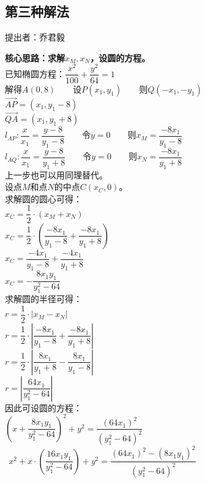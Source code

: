 \documentclass[UTF8]{ctexart}
\begin{document}
\subsection{第三种解法}
    \begin{center}
        提出者：乔君毅
    \end{center}
    \begin{multicols}{2}
        \small
        \textbf{核心思路：求解$x_M,x_N$，设圆的方程。}\\[4mm]
        已知椭圆方程：$\dfrac{x^2}{100}+\dfrac{y^2}{64}=1$\\[5mm]
        解得$A(0,8)$~~~~设$P(x_1,y_1)$~~~~则$Q(-x_1,-y_1)$\\[5mm]
        $\overrightarrow{AP}=(x_1,y_1-8)$\\[5mm]
        $\overrightarrow{QA}=(x_1,y_1+8)$\\[5mm]
        $l_{AP}:\dfrac{x}{x_1}=\dfrac{y-8}{y_1-8}$~~~~令$y=0$~~~~则$x_M=\dfrac{-8x_1}{y_1-8}$\\[5mm]
        $l_{AQ}:\dfrac{x}{x_1}=\dfrac{y-8}{y_1+8}$~~~~令$y=0$~~~~则$x_N=\dfrac{-8x_1}{y_1+8}$\\[5mm]
        上一步也可以用同理替代。\\[8mm]
        设点$M$和点$N$的中点$C(x_C,0)$。\\[3mm]
        求解圆的圆心可得：\\[4mm]
        $x_C=\dfrac{1}{2}\cdot(x_M+x_N)$\\[5mm]
        $x_C=\dfrac{1}{2}\cdot\left(\dfrac{-8x_1}{y_1-8}+\dfrac{-8x_1}{y_1+8}\right)$\\[5mm]
        $x_C=\dfrac{-4x_1}{y_1-8}+\dfrac{-4x_1}{y_1+8}$\\[5mm]
        $x_C=-\dfrac{8x_1y_1}{y_1^2-64}$\\[5mm]
        求解圆的半径可得：\\[4mm]
        $r=\dfrac{1}{2}\cdot\left|x_M-x_N\right|$\\[5mm]
        $r=\dfrac{1}{2}\cdot\left|\dfrac{-8x_1}{y_1-8}+\dfrac{-8x_1}{y_1+8}\right|$\\[5mm]
        $r=\dfrac{1}{2}\cdot\left|\dfrac{8x_1}{y_1+8}-\dfrac{8x_1}{y_1-8}\right|$\\[5mm]
        $r=\left|\dfrac{64x_1}{y_1^2-64}\right|$\\[10mm]
        因此可设圆的方程：\\[4mm]
        $\left(x+\dfrac{8x_1y_1}{y_1^2-64}\right)^2+y^2=\dfrac{(64x_1)^2}{\left(y_1^2-64\right)^2}$\\[5mm]
        $~~x^2+x\cdot\left(\dfrac{16x_1y_1}{y_1^2-64}\right)+y^2=\dfrac{(64x_1)^2-(8x_1y_1)^2}{\left(y_1^2-64\right)^2}$\\[5mm]

\end{multicols}
\end{document}
